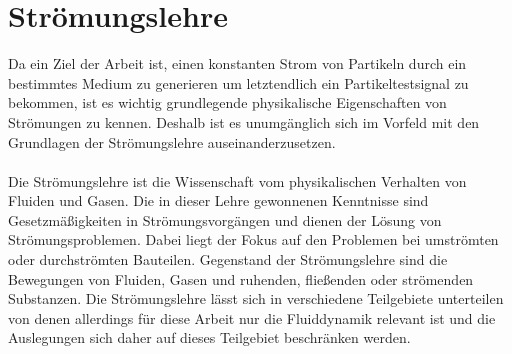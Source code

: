 \section{Str\"{o}mungslehre}
Da ein Ziel der Arbeit ist, einen konstanten Strom von Partikeln durch ein bestimmtes Medium zu generieren um letztendlich ein Partikeltestsignal zu bekommen, ist es wichtig grundlegende physikalische Eigenschaften von Str\"{o}mungen zu kennen. Deshalb ist es unumg\"{a}nglich sich im Vorfeld mit den Grundlagen der Str\"{o}mungslehre auseinanderzusetzen.
\\\\
Die Str\"{o}mungslehre ist die Wissenschaft vom physikalischen Verhalten von Fluiden und Gasen. Die in dieser Lehre gewonnenen Kenntnisse sind Gesetzm\"{a}{\ss}igkeiten in Str\"{o}mungsvorg\"{a}ngen und dienen der L\"{o}sung von Str\"{o}mungsproblemen. Dabei liegt der Fokus auf den Problemen bei umstr\"{o}mten oder durchstr\"{o}mten Bauteilen. Gegenstand der Str\"{o}mungslehre sind die Bewegungen von Fluiden, Gasen und ruhenden, flie{\ss}enden oder str\"{o}menden Substanzen. Die Str\"{o}mungslehre l\"{a}sst sich in verschiedene Teilgebiete unterteilen von denen allerdings f\"{u}r diese Arbeit nur die Fluiddynamik relevant ist und die Auslegungen sich daher auf dieses Teilgebiet beschr\"{a}nken werden.


